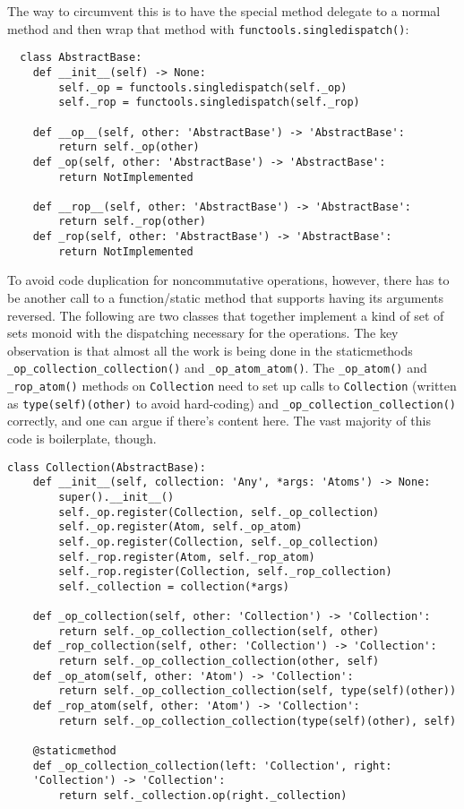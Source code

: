 \documentclass[12pt]{article}
\begin{document}
The way to circumvent this is to have the special method delegate to a
normal method and then wrap that method with
\texttt{functools.singledispatch()}:

\begin{lstlisting}
  class AbstractBase:
    def __init__(self) -> None:
        self._op = functools.singledispatch(self._op)
        self._rop = functools.singledispatch(self._rop)

    def __op__(self, other: 'AbstractBase') -> 'AbstractBase':
        return self._op(other)
    def _op(self, other: 'AbstractBase') -> 'AbstractBase':
        return NotImplemented

    def __rop__(self, other: 'AbstractBase') -> 'AbstractBase':
        return self._rop(other)
    def _rop(self, other: 'AbstractBase') -> 'AbstractBase':
        return NotImplemented
\end{lstlisting}

To avoid code duplication for noncommutative operations, however,
there has to be another call to a function/static method that supports
having its arguments reversed.  The following are two classes that
together implement a kind of set of sets monoid with the dispatching
necessary for the operations.  The key observation is that almost all
the work is being done in the staticmethods
\texttt{\_op\_collection\_collection()} and \texttt{\_op\_atom\_atom()}.
The \texttt{\_op\_atom()} and \texttt{\_rop\_atom()} methods on
\texttt{Collection} need to set up calls to \texttt{Collection}
(written as \texttt{type(self)(other)} to avoid hard-coding) and
\texttt{\_op\_collection\_collection()} correctly, and one can argue if
there's content here.  The vast majority of this code is boilerplate,
though.

\begin{lstlisting}
class Collection(AbstractBase):
    def __init__(self, collection: 'Any', *args: 'Atoms') -> None:
        super().__init__()
        self._op.register(Collection, self._op_collection)
        self._op.register(Atom, self._op_atom)
        self._op.register(Collection, self._op_collection)
        self._rop.register(Atom, self._rop_atom)
        self._rop.register(Collection, self._rop_collection)
        self._collection = collection(*args)

    def _op_collection(self, other: 'Collection') -> 'Collection':
        return self._op_collection_collection(self, other)
    def _rop_collection(self, other: 'Collection') -> 'Collection':
        return self._op_collection_collection(other, self)
    def _op_atom(self, other: 'Atom') -> 'Collection':
        return self._op_collection_collection(self, type(self)(other))
    def _rop_atom(self, other: 'Atom') -> 'Collection':
        return self._op_collection_collection(type(self)(other), self)

    @staticmethod
    def _op_collection_collection(left: 'Collection', right:
    'Collection') -> 'Collection':
        return self._collection.op(right._collection)
\end{lstlisting}
\end{document}
